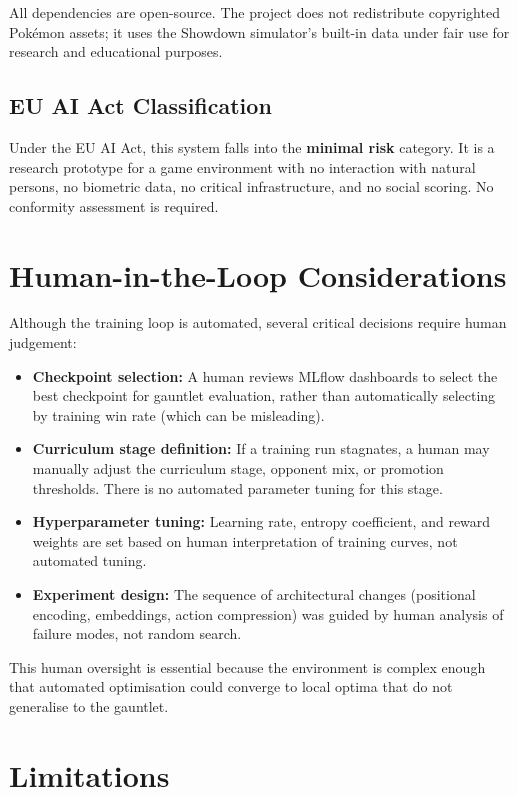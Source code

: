 All dependencies are open-source.  The project does not redistribute
copyrighted Pok\'{e}mon assets; it uses the Showdown simulator's built-in data
under fair use for research and educational purposes.

\subsection{EU AI Act Classification}

Under the EU AI Act, this system falls into the \textbf{minimal risk}
category.  It is a research prototype for a game environment with no
interaction with natural persons, no biometric data, no critical
infrastructure, and no social scoring.  No conformity assessment is required.

\section{Human-in-the-Loop Considerations}

Although the training loop is automated, several critical decisions require
human judgement:

\begin{itemize}
  \item \textbf{Checkpoint selection:} A human reviews MLflow dashboards to
        select the best checkpoint for gauntlet evaluation, rather than
        automatically selecting by training win rate (which can be misleading).
  \item \textbf{Curriculum stage definition:} If a training run stagnates, a
        human may manually adjust the curriculum stage, opponent mix, or
        promotion thresholds. There is no automated parameter tuning for this stage.
  \item \textbf{Hyperparameter tuning:} Learning rate, entropy coefficient,
        and reward weights are set based on human interpretation of training
        curves, not automated tuning.
  \item \textbf{Experiment design:} The sequence of architectural changes
        (positional encoding, embeddings, action compression) was guided by
        human analysis of failure modes, not random search.
\end{itemize}

This human oversight is essential because the environment is complex enough
that automated optimisation could converge to local optima that do not
generalise to the gauntlet.

\section{Limitations}

